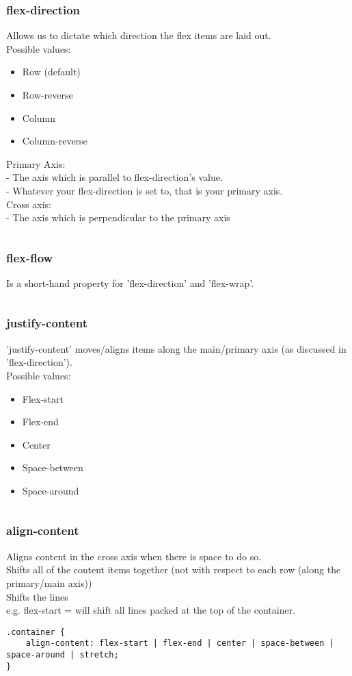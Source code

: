 \documentclass[]{article}
\begin{document}
\subsubsection{flex-direction}
Allows us to dictate which direction the flex items are laid out.
\\
Possible values:
\begin{itemize}
	\item Row (default)
	\item Row-reverse
	\item Column
	\item Column-reverse
\end{itemize}
Primary Axis:\\
 - The axis which is parallel to flex-direction’s value.\\
 - Whatever your flex-direction is set to, that is your primary axis.
 \\
Cross axis:\\
 - The axis which is perpendicular to the primary axis
\\
\begin{lstlisting}
\end{lstlisting}

\subsubsection{flex-flow}
Is a short-hand property for 'flex-direction' and 'flex-wrap'.
\begin{lstlisting}
\end{lstlisting}

\subsubsection{justify-content}
'justify-content' moves/aligns items along the main/primary axis (as discussed in 'flex-direction').
\\
Possible values:
\begin{itemize}
	\item Flex-start
	\item Flex-end
	\item Center
	\item Space-between
	\item Space-around
\end{itemize}
\begin{lstlisting}
\end{lstlisting}

\subsubsection{align-content}
Aligns content in the cross axis when there is space to do so. 
\\
Shifts all of the content items together (not with respect to each row (along the primary/main axis))
\\
Shifts the lines 
\\
e.g. flex-start = will shift all lines packed at the top of the container.
\begin{lstlisting}
.container {
	align-content: flex-start | flex-end | center | space-between | space-around | stretch;
}
\end{lstlisting}
\end{document}
